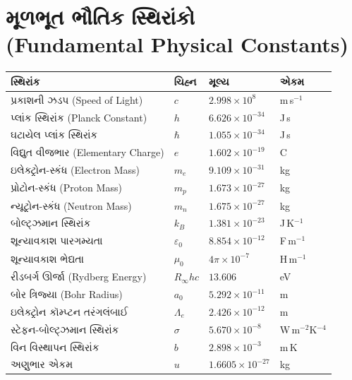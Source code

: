 \appendix

\chapter[પરિશિષ્ટ A : સ્થિરાંકો]{મૂળભૂત ભૌતિક સ્થિરાંકો\\{\large (Fundamental Physical Constants)}}
\label{app:constants}

\begin{center}
\begin{tabular}{@{}llll@{}}
\toprule
\textbf{સ્થિરાંક} & \textbf{ચિહ્ન} & \textbf{મૂલ્ય} & \textbf{એકમ} \\
\midrule
પ્રકાશની ઝડપ (Speed of Light)          & $c$      & $2.998\times10^{8}$        & m\,s$^{-1}$ \\
પ્લાંક સ્થિરાંક (Planck Constant)       & $h$      & $6.626\times10^{-34}$      & J\,s \\
ઘટાયેલ પ્લાંક સ્થિરાંક                  & $\hbar$  & $1.055\times10^{-34}$      & J\,s \\
વિદ્યુત વીજભાર (Elementary Charge)       & $e$      & $1.602\times10^{-19}$      & C \\
ઇલેક્ટ્રોન-સ્કંધ (Electron Mass)         & $m_e$    & $9.109\times10^{-31}$      & kg \\
પ્રોટોન-સ્કંધ (Proton Mass)              & $m_p$    & $1.673\times10^{-27}$      & kg \\
ન્યૂટ્રોન-સ્કંધ (Neutron Mass)           & $m_n$    & $1.675\times10^{-27}$      & kg \\
બોલ્ટ્ઝમાન સ્થિરાંક                      & $k_B$    & $1.381\times10^{-23}$      & J\,K$^{-1}$ \\
શૂન્યાવકાશ પારગમ્યતા                     & $\varepsilon_0$ & $8.854\times10^{-12}$ & F\,m$^{-1}$ \\
શૂન્યાવકાશ ભેદ્યતા                        & $\mu_0$  & $4\pi\times10^{-7}$        & H\,m$^{-1}$ \\
રીડબર્ગ ઊર્જા (Rydberg Energy)          & $R_\infty hc$ & $13.606$             & eV \\
બોર ત્રિજ્યા (Bohr Radius)               & $a_0$    & $5.292\times10^{-11}$      & m \\
ઇલેક્ટ્રોન કૉમ્પ્ટન તરંગલંબાઈ            & $\Lambda_e$ & $2.426\times10^{-12}$   & m \\
સ્ટેફન-બોલ્ટ્ઝમાન સ્થિરાંક                & $\sigma$ & $5.670\times10^{-8}$       & W\,m$^{-2}$K$^{-4}$ \\
વિન વિસ્થાપન સ્થિરાંક                    & $b$      & $2.898\times10^{-3}$       & m\,K \\
અણુભાર એકમ                              & $u$      & $1.6605\times10^{-27}$     & kg \\
\bottomrule
\end{tabular}
\end{center}


